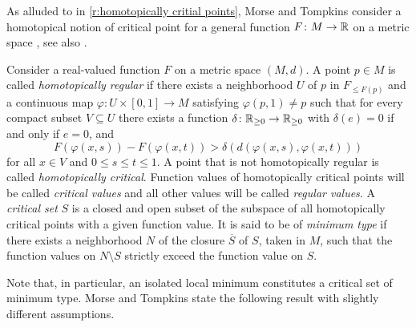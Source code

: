 As alluded to in \cref{r:homotopically critial points}, Morse and Tompkins consider a homotopical notion of critical point for a general function $F \colon M \to \mathbb{R}$ on a metric space \cite[p.~445]{Morse.1939}, see also \cite{Morse.1943}.

\begin{defi}
	Consider a real-valued function $F$ on a metric space $(M,d)$.
	A point $p \in M$ is called \emph{homotopically regular} if there exists a neighborhood $U$ of $p$ in $F_{\leq F(p)}$ and a continuous map $\varphi \colon U \times [0,1] \to M$ satisfying $\varphi(p,1) \neq p$ such that for every compact subset $V \subseteq U$ there exists a function $\delta \colon \mathbb{R}_{\geq 0} \to \mathbb{R}_{\geq 0}$ with
	$\delta(e) = 0$ if and only if $e = 0$, and
	\[
	F(\varphi(x,s)) - F(\varphi(x,t)) > \delta(d(\varphi(x,s),\varphi(x,t)))
	\]
	for all $x \in V$ and $0 \leq s \leq t \leq 1$.
	A point that is not homotopically regular is called \emph{homotopically critical}.
	Function values of homotopically critical points will be called \emph{critical values} and all other values will be called \emph{regular values}.
	A \emph{critical set} $S$ is a closed and open subset of the subspace of all homotopically critical points with a given function value.
	It is said to be of \emph{minimum type} if there exists a neighborhood $N$ of the closure $\overline{S}$ of $S$, taken in $M$, such that the function values on $N \setminus S$ strictly exceed the function value on $S$.
\end{defi}

Note that, in particular, an isolated local minimum constitutes a critical set of minimum type.
Morse and Tompkins state the following result with slightly different assumptions.


